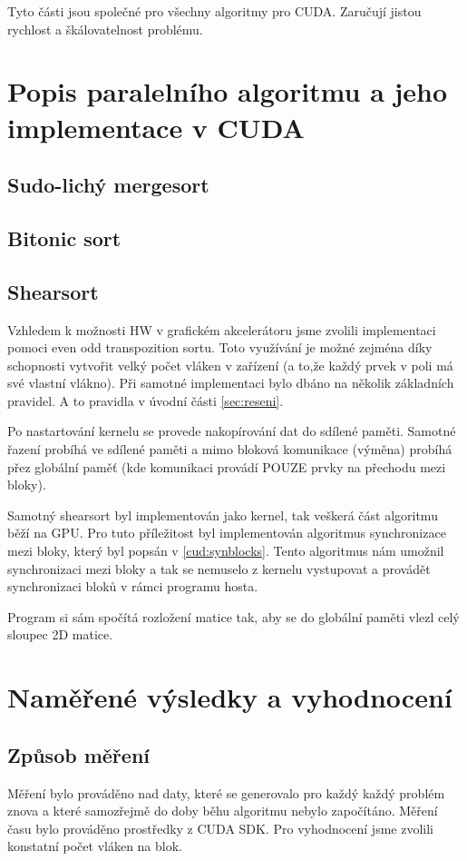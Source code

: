 \documentclass[12pt]{article}
\begin{document}
Tyto části jsou společné pro všechny algoritmy pro CUDA. Zaručují jistou rychlost a škálovatelnost problému.

\section{Popis paralelního algoritmu a jeho implementace v CUDA}
\subsection{Sudo-lichý mergesort}

\subsection{Bitonic sort}

\subsection{Shearsort}
Vzhledem k možnosti HW v grafickém akcelerátoru jsme zvolili implementaci pomoci even odd transpozition sortu. Toto využívání je možné zejména díky schopnosti vytvořit velký počet vláken v zařízení (a to,že každý prvek v poli má své vlastní vlákno). Při samotné implementaci bylo dbáno na několik základních pravidel. A to pravidla v úvodní části \ref{sec:reseni}.

Po nastartování kernelu se provede nakopírování dat do sdílené paměti. Samotné řazení probíhá ve sdílené paměti a mimo bloková komunikace (výměna) probíhá přez globální paměť (kde komunikaci provádí POUZE prvky na přechodu mezi bloky). 

Samotný shearsort byl implementován jako kernel, tak veškerá část algoritmu běží na GPU. Pro tuto příležitost byl implementován algoritmus synchronizace mezi bloky, který byl popsán v \ref{cud:synblocks}. Tento algoritmus nám umožnil synchronizaci mezi bloky a tak se nemuselo z kernelu vystupovat a provádět synchronizaci bloků v rámci programu hosta.

Program si sám spočítá rozložení matice tak, aby se do globální paměti vlezl celý sloupec 2D matice.


\section{Naměřené výsledky a vyhodnocení}
\subsection{Způsob měření}
Měření bylo prováděno nad daty, které se generovalo pro každý každý problém znova a které samozřejmě do doby běhu algoritmu nebylo započítáno. Měření času bylo prováděno prostředky z CUDA SDK. Pro vyhodnocení jsme zvolili konstatní počet vláken na blok.
\end{document}
